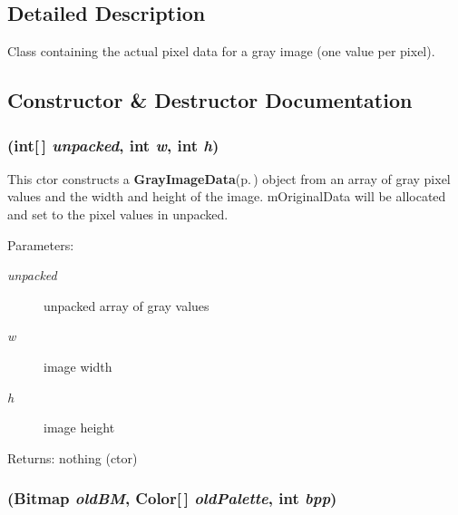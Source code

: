 \subsection{Detailed Description}
Class containing the actual pixel data for a gray image (one value per pixel). 



\subsection{Constructor \& Destructor Documentation}
\subsubsection{ (int[$\,$] {\em unpacked}, int {\em w}, int {\em h})}\label{class_c_s_image_viewer_1_1_gray_image_data_460f31ea25606440ef9dce2e35c2e476}


This ctor constructs a {\bf Gray\-Image\-Data}{\rm (p.\,\pageref{class_c_s_image_viewer_1_1_gray_image_data})} object from an array of gray pixel values and the width and height of the image. m\-Original\-Data will be allocated and set to the pixel values in unpacked. 

\begin{Desc}
\item[Parameters:]
\begin{description}
\item[{\em unpacked}]unpacked array of gray values \item[{\em w}]image width \item[{\em h}]image height \end{description}
\end{Desc}
\begin{Desc}
\item[Returns:]nothing (ctor) \end{Desc}
\subsubsection{ (Bitmap {\em old\-BM}, Color[$\,$] {\em old\-Palette}, int {\em bpp})}\label{class_c_s_image_viewer_1_1_gray_image_data_148bcda539e1b1a85e03ca8e8c5c595d}


